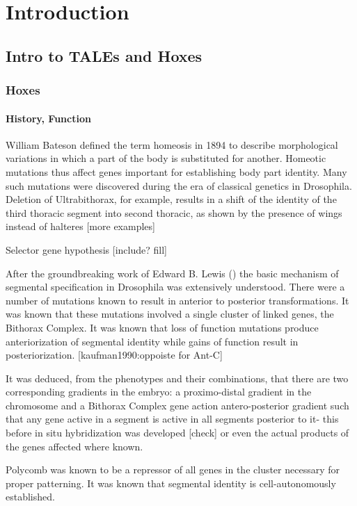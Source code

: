 \chapter{Introduction}
\label{chap:intro}

\section{Intro to TALEs and Hoxes}

\subsection{Hoxes}

\subsubsection{History, Function}
William Bateson defined the term homeosis in 1894 to describe morphological variations in which a part of the body is substituted for another. Homeotic mutations thus affect genes important for establishing body part identity. Many such mutations were discovered during the era of classical genetics in Drosophila. Deletion of Ultrabithorax, for example, results in a shift of the identity of the third thoracic segment into second thoracic, as shown by the presence of wings instead of halteres \cite{ref} [more examples]

Selector gene hypothesis \cite{Garcia-Bellido1975} [include? fill]

After the groundbreaking work of Edward B. Lewis (\cite{Lewis1978}) the basic mechanism of segmental specification in Drosophila was extensively understood. There were a number of mutations known to result in anterior to posterior transformations. It was known that these mutations involved a single cluster of linked genes, the Bithorax Complex. It was known that loss of function mutations produce anteriorization of segmental identity while gains of function result in posteriorization. [kaufman1990:oppoiste for Ant-C]

It was deduced, from the phenotypes and their combinations, that there are two corresponding gradients in the embryo: a proximo-distal gradient in the chromosome and a Bithorax Complex gene action antero-posterior gradient such that any gene active in a segment is active in all segments posterior to it- this before in situ hybridization was developed [check] or even the actual products of the genes affected where known.

Polycomb was known to be a repressor of all genes in the cluster necessary for proper patterning. It was known that segmental identity is cell-autonomously established. 

